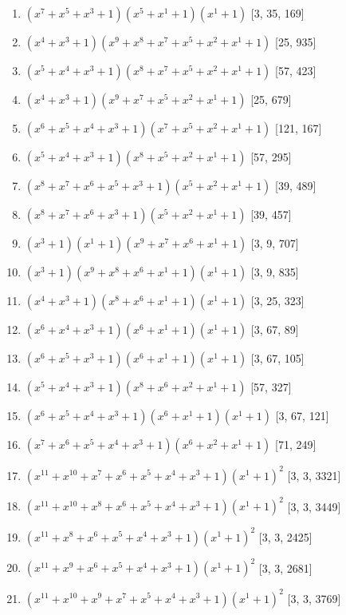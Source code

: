 \documentclass[10pt,twocolumn]{article}
\begin{document}
\begin{enumerate}
\item $(x^{7} + x^{5} + x^{3} + 1)(x^{5} + x^{1} + 1)(x^{1} + 1)$  [3, 35, 169]
\item $(x^{4} + x^{3} + 1)(x^{9} + x^{8} + x^{7} + x^{5} + x^{2} + x^{1} + 1)$  [25, 935]
\item $(x^{5} + x^{4} + x^{3} + 1)(x^{8} + x^{7} + x^{5} + x^{2} + x^{1} + 1)$  [57, 423]
\item $(x^{4} + x^{3} + 1)(x^{9} + x^{7} + x^{5} + x^{2} + x^{1} + 1)$  [25, 679]
\item $(x^{6} + x^{5} + x^{4} + x^{3} + 1)(x^{7} + x^{5} + x^{2} + x^{1} + 1)$  [121, 167]
\item $(x^{5} + x^{4} + x^{3} + 1)(x^{8} + x^{5} + x^{2} + x^{1} + 1)$  [57, 295]
\item $(x^{8} + x^{7} + x^{6} + x^{5} + x^{3} + 1)(x^{5} + x^{2} + x^{1} + 1)$  [39, 489]
\item $(x^{8} + x^{7} + x^{6} + x^{3} + 1)(x^{5} + x^{2} + x^{1} + 1)$  [39, 457]
\item $(x^{3} + 1)(x^{1} + 1)(x^{9} + x^{7} + x^{6} + x^{1} + 1)$  [3, 9, 707]
\item $(x^{3} + 1)(x^{9} + x^{8} + x^{6} + x^{1} + 1)(x^{1} + 1)$  [3, 9, 835]
\item $(x^{4} + x^{3} + 1)(x^{8} + x^{6} + x^{1} + 1)(x^{1} + 1)$  [3, 25, 323]
\item $(x^{6} + x^{4} + x^{3} + 1)(x^{6} + x^{1} + 1)(x^{1} + 1)$  [3, 67, 89]
\item $(x^{6} + x^{5} + x^{3} + 1)(x^{6} + x^{1} + 1)(x^{1} + 1)$  [3, 67, 105]
\item $(x^{5} + x^{4} + x^{3} + 1)(x^{8} + x^{6} + x^{2} + x^{1} + 1)$  [57, 327]
\item $(x^{6} + x^{5} + x^{4} + x^{3} + 1)(x^{6} + x^{1} + 1)(x^{1} + 1)$  [3, 67, 121]
\item $(x^{7} + x^{6} + x^{5} + x^{4} + x^{3} + 1)(x^{6} + x^{2} + x^{1} + 1)$  [71, 249]
\item $(x^{11} + x^{10} + x^{7} + x^{6} + x^{5} + x^{4} + x^{3} + 1)(x^{1} + 1)^{2}$  [3, 3, 3321]
\item $(x^{11} + x^{10} + x^{8} + x^{6} + x^{5} + x^{4} + x^{3} + 1)(x^{1} + 1)^{2}$  [3, 3, 3449]
\item $(x^{11} + x^{8} + x^{6} + x^{5} + x^{4} + x^{3} + 1)(x^{1} + 1)^{2}$  [3, 3, 2425]
\item $(x^{11} + x^{9} + x^{6} + x^{5} + x^{4} + x^{3} + 1)(x^{1} + 1)^{2}$  [3, 3, 2681]
\item $(x^{11} + x^{10} + x^{9} + x^{7} + x^{5} + x^{4} + x^{3} + 1)(x^{1} + 1)^{2}$  [3, 3, 3769]

\end{enumerate}
\end{document}
